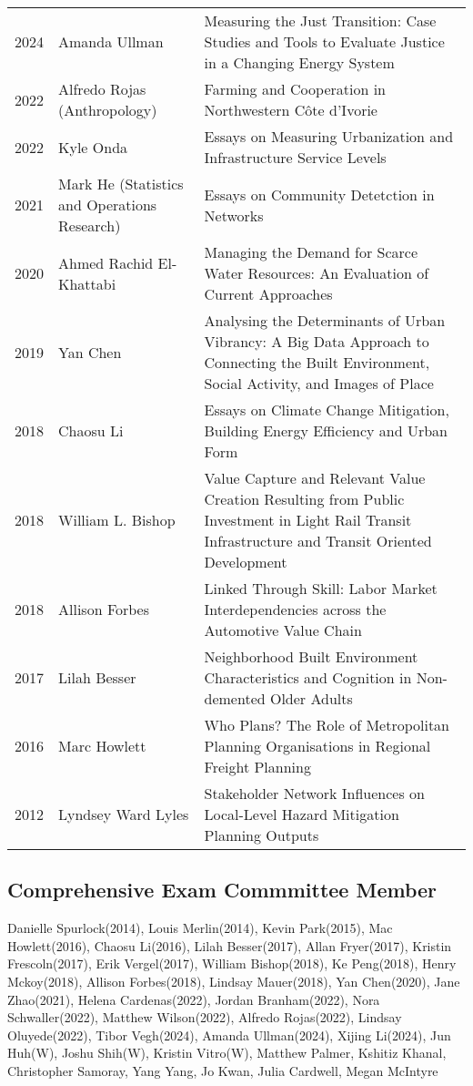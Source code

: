 \documentclass[11pt,a4paper,]{awesome-cv}
\begin{document}
\begin{tabular}{lp{3cm}p{12cm}}
  2024 & Amanda Ullman & Measuring the Just Transition: Case Studies and Tools to Evaluate Justice in a Changing Energy System \\ 
  2022 & Alfredo Rojas (Anthropology) & Farming and Cooperation in Northwestern Côte d'Ivorie \\ 
  2022 & Kyle Onda & Essays on Measuring Urbanization and Infrastructure Service Levels \\ 
  2021 & Mark He (Statistics and Operations Research) & Essays on Community Detetction in Networks \\ 
  2020 & Ahmed Rachid El-Khattabi & Managing the Demand for Scarce Water Resources: An Evaluation of Current Approaches \\ 
  2019 & Yan Chen & Analysing the Determinants of Urban Vibrancy: A Big Data Approach to Connecting the Built Environment, Social Activity, and Images of Place \\ 
  2018 & Chaosu Li & Essays on Climate Change Mitigation, Building Energy Efficiency and Urban Form \\ 
  2018 & William L. Bishop & Value Capture and Relevant Value Creation Resulting from Public Investment in Light Rail Transit Infrastructure and Transit Oriented Development \\ 
  2018 & Allison Forbes & Linked Through Skill: Labor Market Interdependencies across the Automotive Value Chain \\ 
  2017 & Lilah Besser & Neighborhood Built Environment Characteristics and Cognition in Non-demented Older Adults \\ 
  2016 & Marc Howlett & Who Plans? The Role of Metropolitan Planning Organisations in Regional Freight Planning \\ 
  2012 & Lyndsey Ward Lyles & Stakeholder Network Influences on Local-Level Hazard Mitigation Planning Outputs \\ 
  \end{tabular}

\subsection{Comprehensive Exam Commmittee
Member}\label{comprehensive-exam-commmittee-member}

Danielle Spurlock(2014), Louis Merlin(2014), Kevin Park(2015), Mac
Howlett(2016), Chaosu Li(2016), Lilah Besser(2017), Allan Fryer(2017),
Kristin Frescoln(2017), Erik Vergel(2017), William Bishop(2018), Ke
Peng(2018), Henry Mckoy(2018), Allison Forbes(2018), Lindsay
Mauer(2018), Yan Chen(2020), Jane Zhao(2021), Helena Cardenas(2022),
Jordan Branham(2022), Nora Schwaller(2022), Matthew Wilson(2022),
Alfredo Rojas(2022), Lindsay Oluyede(2022), Tibor Vegh(2024), Amanda
Ullman(2024), Xijing Li(2024), Jun Huh(W), Joshu Shih(W), Kristin
Vitro(W), Matthew Palmer, Kshitiz Khanal, Christopher Samoray, Yang
Yang, Jo Kwan, Julia Cardwell, Megan McIntyre
\end{document}
